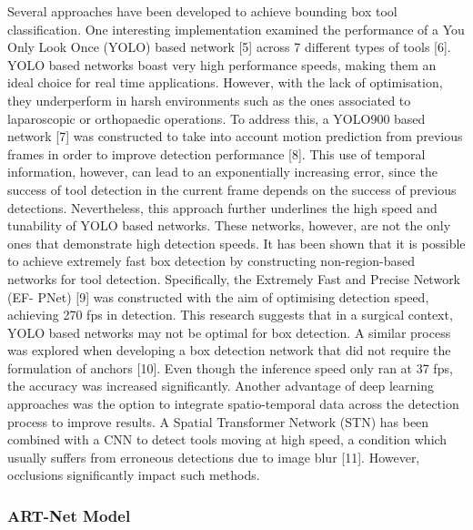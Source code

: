 Several approaches have been developed to achieve bounding box tool classification. One interesting implementation examined the performance of a You Only Look Once (YOLO) based network [5] across 7 different types of tools [6]. YOLO based networks boast very high performance speeds, making them an ideal choice for real time applications. However, with the lack of optimisation, they underperform in harsh environments such as the ones associated to laparoscopic or orthopaedic operations. To address this, a YOLO900 based network [7] was constructed to take into account motion prediction from previous frames in order to improve detection performance [8]. This use of temporal information, however, can lead to an exponentially increasing error, since the success of tool detection in the current frame depends on the success of previous detections. Nevertheless, this approach further underlines the high speed and tunability of YOLO based networks. These networks, however, are not the only ones that demonstrate high detection speeds. It has been shown that it is possible to achieve extremely fast box detection by constructing non-region-based networks for tool detection. Specifically, the Extremely Fast and Precise Network (EF- PNet) [9] was constructed with the aim of optimising detection speed, achieving 270 fps in detection. This research suggests that in a surgical context, YOLO based networks may not be optimal for box detection. A similar process was explored when developing a box detection network that did not require the formulation of anchors [10]. Even though the inference speed only ran at 37 fps, the accuracy was increased significantly. Another advantage of deep learning approaches was the option to integrate spatio-temporal data across the detection process to improve results. A Spatial Transformer Network (STN) has been combined with a CNN to detect tools moving at high speed, a condition which usually suffers from erroneous detections due to image blur [11]. However, occlusions significantly impact such methods.

\subsubsection{ART-Net Model}

